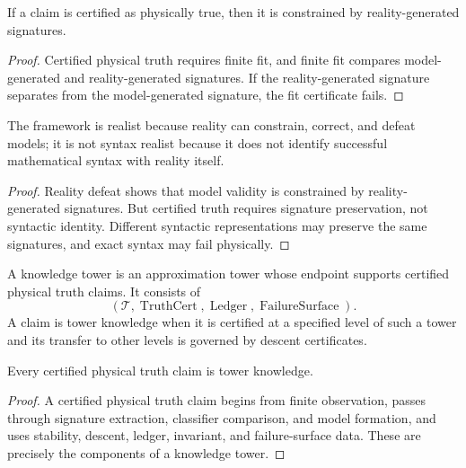 \begin{theorem}
\label{thm:certified-physical-truth-reality-constrained}
If a claim is certified as physically true, then it is constrained by reality-generated signatures.
\end{theorem}

\begin{proof}
Certified physical truth requires finite fit, and finite fit compares model-generated and reality-generated signatures. If the reality-generated signature separates from the model-generated signature, the fit certificate fails.
\end{proof}

\begin{corollary}
\label{cor:realist-not-syntax-realist}
The framework is realist because reality can constrain, correct, and defeat models; it is not syntax realist because it does not identify successful mathematical syntax with reality itself.
\end{corollary}

\begin{proof}
Reality defeat shows that model validity is constrained by reality-generated signatures. But certified truth requires signature preservation, not syntactic identity. Different syntactic representations may preserve the same signatures, and exact syntax may fail physically.
\end{proof}

\begin{definition}
\label{def:knowledge-tower}
A knowledge tower is an approximation tower whose endpoint supports certified physical truth claims. It consists of
$$
(\mathcal T,\operatorname{TruthCert},\operatorname{Ledger},\operatorname{FailureSurface}).
$$
A claim is tower knowledge when it is certified at a specified level of such a tower and its transfer to other levels is governed by descent certificates.
\end{definition}

\begin{theorem}
\label{thm:physical-knowledge-tower-knowledge}
Every certified physical truth claim is tower knowledge.
\end{theorem}

\begin{proof}
A certified physical truth claim begins from finite observation, passes through signature extraction, classifier comparison, and model formation, and uses stability, descent, ledger, invariant, and failure-surface data. These are precisely the components of a knowledge tower.
\end{proof}

